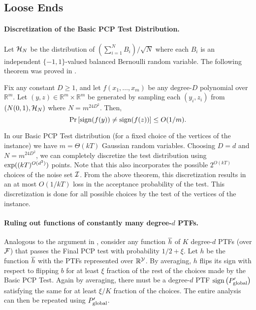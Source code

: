 \subsection{Loose Ends}\label{sec:ends}

\paragraph{Discretization of the Basic PCP Test Distribution.}
Let $\mathcal{H}_N$ be the distribution of $\left(\sum_{i=1}^N B_i\right)/\sqrt{N}$
where each $B_i$ is an independent $\{-1,1\}$-valued balanced
Bernoulli random variable. The following theorem was proved in \cite{DOSW11}.

\begin{theorem} Fix any constant $D \geq 1$, and let $f(x_1,\dots,
x_m)$ be any degree-$D$ polynomial over $\mathbb{R}^m$. Let $(y, z)
\in \mathbb{R}^m\times \mathbb{R}^m$ be generated by sampling each
$(y_i,z_i)$ from $(N(0,1), \mathcal{H}_N)$ where $N = m^{24D^2}$. Then,
$$\Pr\left[\textnormal{sign}(f(y)) \neq \textnormal{sign}(f(z))\right] \leq O(1/m).$$
\end{theorem}

In our Basic PCP Test distribution (for a fixed choice of the vertices of
the \LC instance) we have $m = \Theta(kT)$ Gaussian random
variables. Choosing $D = d$ and $N = m^{24D^2}$, we can completely
discretize the test distribution using $\textnormal{exp}((kT)^{O(d^2)})$ points. Note
that this also incorporates the possible $2^{O(kT)}$ choices of the
noise set $\mathcal{I}$. From the above theorem, this discretization
results in an at most $O(1/kT)$ loss in the acceptance probability of
the test. This discretization is done for all
possible choices by the test of the vertices of the instance. 

\paragraph{Ruling out functions of constantly many degree-$d$ PTFs.}
Analogous to the argument in \cite{KS11}, consider any function $\overline{h}$ of
$K$ degree-$d$ PTFs (over $\mathcal{F}$) that passes the Final PCP test with probability $1/2 +
\xi$. Let $h$ be the function $\overline{h}$ with the PTFs represented over $\mathbb{R}^{\mathcal{Y}}$. 
By averaging, $h$ flips its sign with respect to flipping $b$ for at
least $\xi$ fraction of the rest of the choices made by the Basic PCP Test.
Again by averaging, there must be a degree-$d$ PTF $\textnormal{sign}\left(P'_{\textnormal{global}}\right)$ satisfying the
same for at least $\xi/K$ fraction of the choices. The entire
analysis can then be repeated using $P'_{\textnormal{global}}$.
